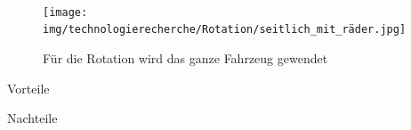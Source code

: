 \paragraph{}
\begin{figure}[h!]
        \centering
        \texttt{[image: img/technologierecherche/Rotation/seitlich\_mit\_räder.jpg]}
        \caption{Für die Rotation wird das ganze Fahrzeug gewendet}
        \label{img:tech_seitlich_mit_räder}
\end{figure}
\begin{minipage}[t]{0.48\textwidth}
    \begin{items}
          \item [Vorteile]
          \item 
          \item 
    \end{items}
\end{minipage}
\hfill
\begin{minipage}[t]{0.48\textwidth}
    \begin{items}
          \item [Nachteile]
          \item 
          \item
          \item 
          \item 
    \end{items}
\end{minipage}
